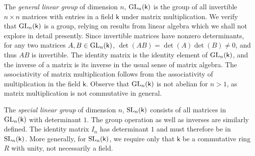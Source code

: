 \begin{example}
    \label{ex:linear-groups}
    The \emph{general linear group} of dimension \(n\), \(\operatorname{GL}_n(\mathsf{k})\) is
    the group of all invertible \(n \times n\) matrices with entries in a field
    \(\mathsf{k}\) under matrix multiplication. We verify that
    \(\operatorname{GL}_n(\mathsf{k})\) is a group, relying on results from linear algebra
    which we shall not explore in detail presently. Since invertible matrices
    have nonzero determinants, for any two matrices \(A, B \in
    \operatorname{GL}_n(\mathsf{k})\), \(\det(AB) = \det(A)\det(B) \neq 0\), and thus \(AB\)
    is invertible. The identity matrix is the identity element of
    \(\operatorname{GL}_n(\mathsf{k})\), and the inverse of a matrix is its inverse in the
    usual sense of matrix algebra. The associativity of matrix multiplication
    follows from the associativity of multiplication in the field
    \(\mathsf{k}\). Observe that \(\operatorname{GL}_n(\mathsf{k})\) is not abelian for \(n >
    1\), as matrix multiplication is not commutative in general.

    The \emph{special linear group} of dimension \(n\), \(\operatorname{SL}_n(\mathsf{k})\)
    consists of all matrices in \(\operatorname{GL}_n(\mathsf{k})\) with determinant \(1\).
    The group operation as well as inverses are similarly defined. The identity
    matrix \(I_n\) has determinant \(1\) and must therefore be in
    \(\operatorname{SL}_n(\mathsf{k})\). More generally, for \(\operatorname{SL}_n(\mathsf{k})\), we require
    only that \(\mathsf{k}\) be a commutative ring \(R\) with unity, not
    necessarily a field.
\end{example}

